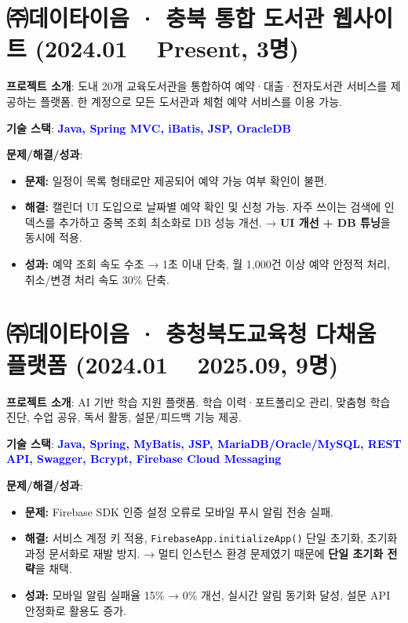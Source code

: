 \documentclass[a4paper,11pt]{article}
\newcommand{\tech}[1]{\textbf{\textcolor{blue}{#1}}}
\begin{document}
\section{㈜데이타이음 · 충북 통합 도서관 웹사이트 (2024.01 ~ Present, 3명)}

\textbf{프로젝트 소개}:  
도내 20개 교육도서관을 통합하여 예약·대출·전자도서관 서비스를 제공하는 플랫폼.  
한 계정으로 모든 도서관과 체험 예약 서비스를 이용 가능.  

\textbf{기술 스택}: \tech{Java, Spring MVC, iBatis, JSP, OracleDB}  

\textbf{문제/해결/성과}:
\begin{itemize}[leftmargin=*]
  \item \textbf{문제:} 일정이 목록 형태로만 제공되어 예약 가능 여부 확인이 불편.
  \item \textbf{해결:} 캘린더 UI 도입으로 날짜별 예약 확인 및 신청 가능. 자주 쓰이는 검색에 인덱스를 추가하고 중복 조회 최소화로 DB 성능 개선.  
  → \textbf{UI 개선 + DB 튜닝}을 동시에 적용.
  \item \textbf{성과:} 예약 조회 속도 수초 → 1초 이내 단축, 월 1,000건 이상 예약 안정적 처리, 취소/변경 처리 속도 30\% 단축.
\end{itemize}

\section{㈜데이타이음 · 충청북도교육청 다채움 플랫폼 (2024.01 ~ 2025.09, 9명)}

\textbf{프로젝트 소개}:  
AI 기반 학습 지원 플랫폼.  
학습 이력·포트폴리오 관리, 맞춤형 학습 진단, 수업 공유, 독서 활동, 설문/피드백 기능 제공.  

\textbf{기술 스택}: \tech{Java, Spring, MyBatis, JSP, MariaDB/Oracle/MySQL, REST API, Swagger, Bcrypt, Firebase Cloud Messaging}  

\textbf{문제/해결/성과}:
\begin{itemize}[leftmargin=*]
  \item \textbf{문제:} Firebase SDK 인증 설정 오류로 모바일 푸시 알림 전송 실패.
  \item \textbf{해결:} 서비스 계정 키 적용, \texttt{FirebaseApp.initializeApp()} 단일 초기화, 초기화 과정 문서화로 재발 방지.  
  → 멀티 인스턴스 환경 문제였기 때문에 \textbf{단일 초기화 전략}을 채택.
  \item \textbf{성과:} 모바일 알림 실패율 15\% → 0\% 개선, 실시간 알림 동기화 달성, 설문 API 안정화로 활용도 증가.
\end{itemize}
\end{document}
